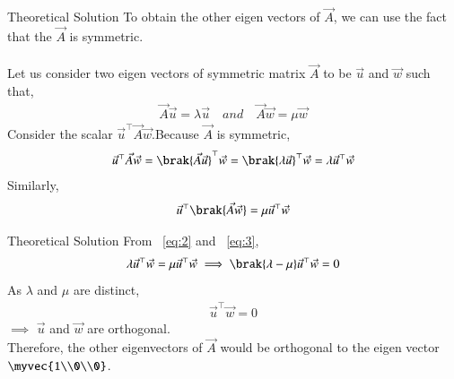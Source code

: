 \documentclass{beamer}
\begin{document}
\begin{frame}{Theoretical Solution}
To obtain the other eigen vectors of $\vec{A}$, we can use the fact that the $\vec{A}$ is symmetric.\\
\\
Let us consider two eigen vectors of symmetric matrix $\vec{A}$ to be $\vec{u}$ and $\vec{w}$ such that,
\begin{align}
    \vec{A}\vec{u}=\lambda\vec{u} \quad and \quad \vec{A}\vec{w}=\mu \vec{w}
\end{align}
Consider the scalar $\vec{u}^{\top}\vec{A}\vec{w}$.Because $\vec{A}$ is symmetric,
\begin{align}
    \vec{u}^{\top}\vec{A}\vec{w}=\brak{\vec{A}\vec{u}}^{\top}\vec{w}=\brak{\lambda \vec{u}}^{\top}\vec{w}=\lambda\vec{u}^{\top}\vec{w}
    \label{eq:2}
\end{align}
Similarly,
\begin{align}
    \vec{u}^{\top}\brak{\vec{A}\vec{w}}=\mu\vec{u}^{\top}\vec{w}
    \label{eq:3}
\end{align}

\end{frame}

\begin{frame}{Theoretical Solution}
From ~\eqref{eq:2} and ~\eqref{eq:3},
\begin{align}
    \lambda\vec{u}^{\top}\vec{w}=\mu \vec{u}^{\top}\vec{w}
    \implies \brak{\lambda-\mu}\vec{u}^{\top}\vec{w}=0
\end{align}
As $\lambda$ and $\mu$ are distinct,
\begin{align}
    \vec{u}^{\top}\vec{w}=0
\end{align}
$\implies$ $\vec{u}$ and $\vec{w}$ are orthogonal.\\
Therefore, the other eigenvectors of $\vec{A}$ would be orthogonal to the eigen vector $\myvec{1\\0\\0}$.
\end{frame}
\end{document}
